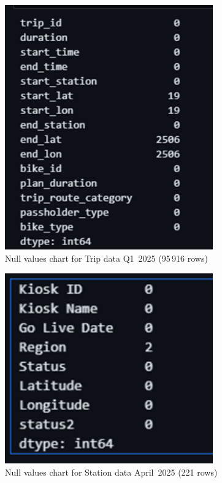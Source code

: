 \documentclass{article}
\begin{document}
\begin{figure}[H]
    \centering
    \includegraphics[width=0.8\textwidth]{tripdata.png}
    \caption{Null values chart for Trip data Q1~2025 (95\,916 rows)}
    \label{fig:null_values_trip_q1_2025}
\end{figure}

\begin{figure}[H]
    \centering
\includegraphics[width=0.8\textwidth]{stationdata.png}
    \caption{Null values chart for Station data April~2025 (221 rows)}
    \label{fig:null_values_station_apr_2025}
\end{figure}
\end{document}
